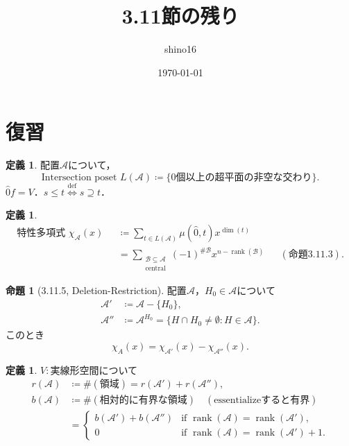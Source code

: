 \documentclass[xelatex,ja=standard,a4paper,14pt,everyparhook=compat]{bxjsarticle}
\title{3.11節の残り}
\author{shino16}
\date{\today}
\newcommand{\mcA}{\mathcal{A}}
\newcommand{\mcB}{\mathcal{B}}
\DeclareMathOperator{\rank}{rank}
\theoremstyle{definition}
\newtheorem{definition}[theorem]{定義}
\newtheorem{proposition}[theorem]{命題}
\begin{document}
\maketitle

\tableofcontents

\newpage

\setcounter{section}{-1}
\section{復習}

\begin{definition}
    配置$\mcA$について， \begin{equation*}
        \text{Intersection poset $L(\mcA) \coloneqq \{\text{$0$個以上の超平面の非空な交わり}\}$}.
    \end{equation*}
    $\hat 0f = V$．$s \leq t \overset{\mathrm{def}}{\iff} s \supseteq t$．
\end{definition}

\begin{definition}
    \begin{align*}
        \text{特性多項式 $\chi_\mcA(x)$ }
         & \coloneqq \sum_{t \in L(\mcA)} \mu(\hat0, t) x^{\dim(t)} \\
         & = \sum_{\substack{\mcB \subseteq \mcA                    \\ \text{central}}} (-1)^{\#\mcB} x^{n - \rank(\mcB)} && (\text{命題3.11.3}).
    \end{align*}
\end{definition}

\begin{proposition}[3.11.5, Deletion-Restriction]
    配置$\mcA$，$H_0 \in \mcA$について \begin{align*}
        \mcA'  & \coloneqq \mcA - \{H_0\},                                          \\
        \mcA'' & \coloneqq \mcA^{H_0} = \{H \cap H_0 \neq \emptyset : H \in \mcA\}.
    \end{align*}
    このとき \begin{equation*}
        \chi_A(x) = \chi_{\mcA'}(x) - \chi_{\mcA''}(x).
    \end{equation*}
\end{proposition}

\begin{definition}
    $V : \text{実線形空間}$について \begin{align*}
        r(\mcA) & \coloneqq \#(\text{領域}) = r(\mcA') + r(\mcA''),                             \\
        b(\mcA) & \coloneqq \#(\text{相対的に有界な領域}) \quad (\text{essentializeすると有界}) \\
                & = \begin{cases}
            b(\mcA') + b(\mcA'') & \text{if $\rank(\mcA) = \rank(\mcA')$,}     \\
            0                    & \text{if $\rank(\mcA) = \rank(\mcA') + 1$.}
        \end{cases}
    \end{align*}
\end{definition}
\end{document}
